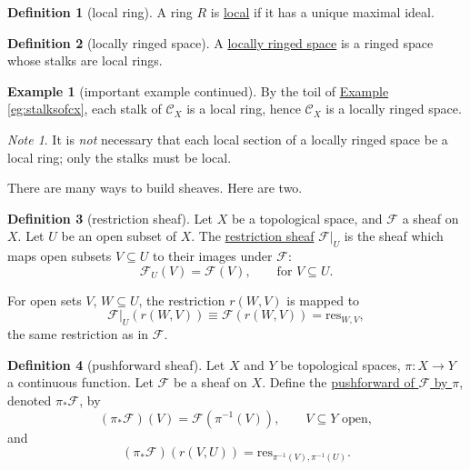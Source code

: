 \documentclass[a4paper]{report}
\newcommand{\defn}[1]{\ul{#1}}
\theoremstyle{definition}
\newtheorem{definition}{Definition}[section]
\newtheorem{example}{Example}[section]
\theoremstyle{plain}
\theoremstyle{remark}
\newtheorem{note}{Note}[section]
\begin{document}
\begin{definition}[local ring]
  \label{def:local ring} 
  A ring $R$ is \defn{local} if it has a unique maximal ideal.
\end{definition}

\begin{definition}[locally ringed space]
  A \defn{locally ringed space} is a ringed space whose stalks are local rings.
\end{definition}

\begin{example}[important example continued]
  By the toil of \hyperref[eg:stalksofcx]{Example \ref*{eg:stalksofcx}}, each stalk of $\mathcal{C}_{X}$ is a local ring, hence $\mathcal{C}_{X}$ is a locally ringed space.
\end{example}

\begin{note}
  It is \emph{not} necessary that each local section of a locally ringed space be a local ring; only the stalks must be local.
\end{note}

There are many ways to build sheaves. Here are two.

\begin{definition}[restriction sheaf]
  \label{def:restrictionsheaf}
  Let $X$ be a topological space, and $\mathcal{F}$ a sheaf on $X$. Let $U$ be an open subset of $X$. The \defn{restriction sheaf} $\mathcal{F}|_{U}$ is the sheaf which maps open subsets $V\subseteq U$ to their images under $\mathcal{F}$:
  \begin{equation*}
    \mathcal{F}_{U}(V) = \mathcal{F}(V),\qquad\text{for }V \subseteq U.
  \end{equation*}

  For open sets $V$, $W \subseteq U$, the restriction $r(W,V)$ is mapped to 
  \begin{equation*}
    \mathcal{F}|_{U}(r(W,V)) \equiv \mathcal{F}(r(W,V)) = \mathrm{res}_{W,V},
  \end{equation*}
  the same restriction as in $\mathcal{F}$.
\end{definition}

\begin{definition}[pushforward sheaf]
  \label{def:pushforwardsheaf}
  Let $X$ and $Y$ be topological spaces, $\pi\colon X \to Y$ a continuous function. Let $\mathcal{F}$ be a sheaf on $X$. Define the \defn{pushforward of $\mathcal{F}$ by $\pi$}, denoted $\pi_{*}\mathcal{F}$, by
  \begin{equation*}
    (\pi_{*}\mathcal{F})(V) = \mathcal{F}(\pi^{-1}(V)),\qquad V\subseteq Y\text{ open},
  \end{equation*}
  and
  \begin{equation*}
    (\pi_{*}\mathcal{F})(r(V,U)) = \mathrm{res}_{\pi^{-1}(V), \pi^{-1}(U)}.
  \end{equation*}
\end{definition}
\end{document}
